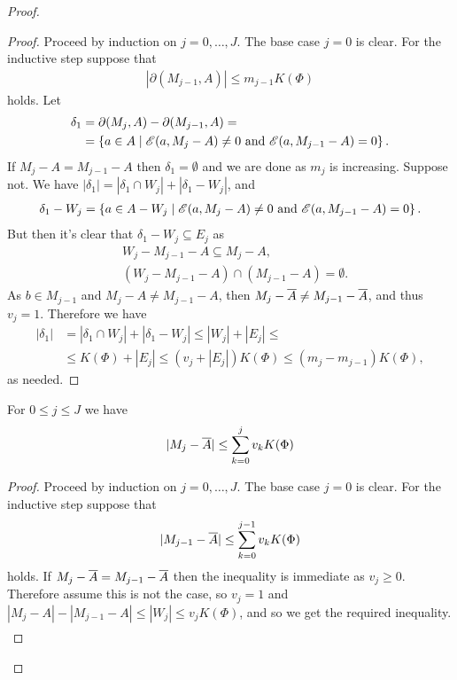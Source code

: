 \documentclass{amsart}
\begin{document}
\begin{proof}
  \begin{proof} %
    Proceed by induction on $j = 0, \ldots, J$. The base case $j = 0$ is clear.
    For the inductive step suppose that
    \begin{align*}
      |\partial(M_{j-1}, A)| \leq m_{j-1}  K(\Phi)
    \end{align*}
    holds.
    Let
    \begin{align*}
      \delta_1 &= \partial(M_j, A) - \partial(M_{j-1}, A) = \\
               &=\left\{a \in A \mid  \mathscr E(a, M_j - A) \neq 0 \text{ and } \mathscr E(a, M_{j-1} - A) = 0\right\}.
    \end{align*}
    If $M_j - A = M_{j-1} - A$ then $\delta_1 = \emptyset$ and we are done as $m_j$ is increasing.
    Suppose not.
    We have $|\delta_1| = |\delta_1 \cap W_j| + |\delta_1 - W_j|$, and
    \begin{align*}
      \delta_1 - W_j = \left\{a \in A - W_j \mid \mathscr E(a, M_j - A) \neq 0 \text{ and } \mathscr E(a, M_{j-1} - A) = 0\right\}.
    \end{align*}
    But then it's clear that $\delta_1 - W_j \subseteq E_j$ as
    \begin{align*}
      &W_j - M_{j-1} - A \subseteq M_j - A, \\
      &(W_j - M_{j-1} - A) \cap (M_{j-1} - A) = \emptyset.
    \end{align*}
    As $b \in M_{j-1}$ and $M_j - A \neq M_{j-1} - A$, then $M_j - \overline{A} \neq M_{j-1} - \overline{A}$, and thus $v_j = 1$. 
    Therefore we have
    \begin{align*}
      |\delta_1| &= |\delta_1 \cap W_j| + |\delta_1 - W_j| \leq |W_j| + |E_j| \leq \\
      &\leq K(\Phi) + |E_j|
      \leq (v_j + |E_j|) K(\Phi)  \leq (m_j - m_{j-1}) K(\Phi),
    \end{align*}
    as needed.
  \end{proof}

  \begin{Lemma} \label{ub_lemma}
    For $0 \leq j \leq J$ we have
    \begin{align*}
      |M_j - \overline{A}| \leq \sum_{k=0}^j v_{k} K(\Phi)
    \end{align*}
  \end{Lemma}

  \begin{proof} %
    Proceed by induction on $j = 0, \ldots, J$. The base case $j = 0$ is clear.
    For the inductive step suppose that
    \begin{align*}
      |M_{j-1} - \overline{A}| \leq \sum_{k=0}^{j-1} v_{k} K(\Phi)
    \end{align*}
    holds.
    If $M_j - \overline{A} = M_{j-1} - \overline{A}$ then the inequality is immediate as $v_j \geq 0$.
    Therefore assume this is not the case, so $v_j = 1$ and $|M_j - A| - |M_{j-1} - A| \leq |W_j| \leq v_j K(\Phi)$, and so we get the required inequality.
    \begin{align*}
    \end{align*}
  \end{proof}
  

\end{proof}
\end{document}
